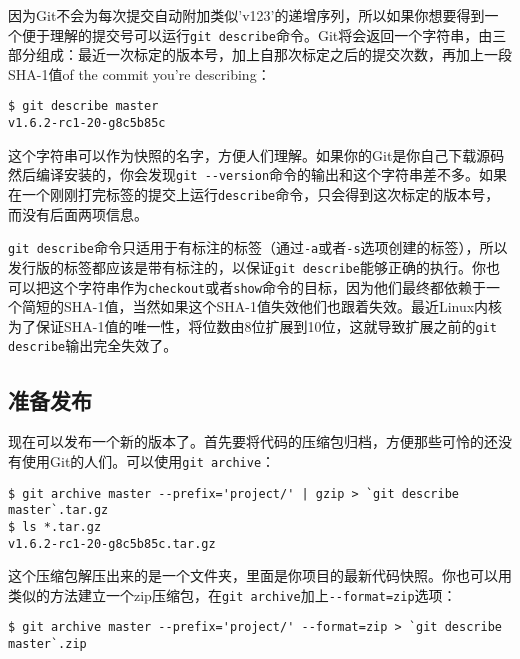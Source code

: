 \documentclass[a4paper]{book}
\begin{document}
因为Git不会为每次提交自动附加类似'v123'的递增序列，所以如果你想要得到一个便于理解的提交号可以运行\texttt{git describe}命令。Git将会返回一个字符串，由三部分组成：最近一次标定的版本号，加上自那次标定之后的提交次数，再加上一段SHA-1值of the commit you're describing：

\begin{shaded}\begin{verbatim}
$ git describe master
v1.6.2-rc1-20-g8c5b85c
\end{verbatim}\end{shaded}

这个字符串可以作为快照的名字，方便人们理解。如果你的Git是你自己下载源码然后编译安装的，你会发现\texttt{git -{}-version}命令的输出和这个字符串差不多。如果在一个刚刚打完标签的提交上运行\texttt{describe}命令，只会得到这次标定的版本号，而没有后面两项信息。

\texttt{git describe}命令只适用于有标注的标签（通过\texttt{-a}或者\texttt{-s}选项创建的标签），所以发行版的标签都应该是带有标注的，以保证\texttt{git describe}能够正确的执行。你也可以把这个字符串作为\texttt{checkout}或者\texttt{show}命令的目标，因为他们最终都依赖于一个简短的SHA-1值，当然如果这个SHA-1值失效他们也跟着失效。最近Linux内核为了保证SHA-1值的唯一性，将位数由8位扩展到10位，这就导致扩展之前的\texttt{git describe}输出完全失效了。

\subsection{准备发布}

现在可以发布一个新的版本了。首先要将代码的压缩包归档，方便那些可怜的还没有使用Git的人们。可以使用\texttt{git archive}：

\begin{shaded}\begin{verbatim}
$ git archive master --prefix='project/' | gzip > `git describe master`.tar.gz
$ ls *.tar.gz
v1.6.2-rc1-20-g8c5b85c.tar.gz
\end{verbatim}\end{shaded}

这个压缩包解压出来的是一个文件夹，里面是你项目的最新代码快照。你也可以用类似的方法建立一个zip压缩包，在\texttt{git archive}加上\texttt{-{}-format=zip}选项：

\begin{shaded}\begin{verbatim}
$ git archive master --prefix='project/' --format=zip > `git describe master`.zip
\end{verbatim}\end{shaded}
\end{document}
